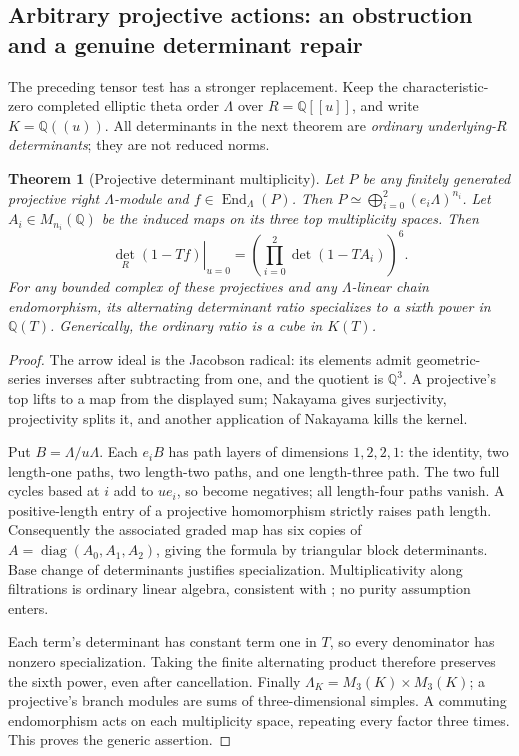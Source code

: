 \documentclass[11pt]{article}
\newtheorem{theorem}{Theorem}[section]
\theoremstyle{definition}\newtheorem{definition}[theorem]{Definition}
\theoremstyle{remark}\newtheorem{remark}[theorem]{Remark}
\begin{document}
\subsection{Arbitrary projective actions: an obstruction and a genuine determinant repair}
The preceding tensor test has a stronger replacement. Keep the characteristic-zero completed elliptic theta order $\Lambda$ over $R=\mathbb Q[[u]]$, and write $K=\mathbb Q((u))$. All determinants in the next theorem are \emph{ordinary underlying-$R$ determinants}; they are not reduced norms.
\begin{theorem}[Projective determinant multiplicity]\label{thm:theta-multiplicity}
Let $P$ be any finitely generated projective right $\Lambda$-module and $f\in\operatorname{End}_\Lambda(P)$. Then $P\simeq\bigoplus_{i=0}^2(e_i\Lambda)^{n_i}$. Let $A_i\in M_{n_i}(\mathbb Q)$ be the induced maps on its three top multiplicity spaces. Then
\[
 \left.\det_R(1-Tf)\right|_{u=0}
 =\left(\prod_{i=0}^2\det(1-TA_i)\right)^6.
\]
For any bounded complex of these projectives and any $\Lambda$-linear chain endomorphism, its alternating determinant ratio specializes to a sixth power in $\mathbb Q(T)$. Generically, the ordinary ratio is a cube in $K(T)$.
\end{theorem}
\begin{proof}
The arrow ideal is the Jacobson radical: its elements admit geometric-series inverses after subtracting from one, and the quotient is $\mathbb Q^3$. A projective's top lifts to a map from the displayed sum; Nakayama gives surjectivity, projectivity splits it, and another application of Nakayama kills the kernel.

Put $B=\Lambda/u\Lambda$. Each $e_iB$ has path layers of dimensions $1,2,2,1$: the identity, two length-one paths, two length-two paths, and one length-three path. The two full cycles based at $i$ add to $ue_i$, so become negatives; all length-four paths vanish. A positive-length entry of a projective homomorphism strictly raises path length. Consequently the associated graded map has six copies of $A=\operatorname{diag}(A_0,A_1,A_2)$, giving the formula by triangular block determinants. Base change of determinants justifies specialization. Multiplicativity along filtrations is ordinary linear algebra, consistent with \cite[Tags0FJ9,0GSX]{StacksDeterminants}; no purity assumption enters.

Each term's determinant has constant term one in $T$, so every denominator has nonzero specialization. Taking the finite alternating product therefore preserves the sixth power, even after cancellation. Finally $\Lambda_K=M_3(K)\times M_3(K)$; a projective's branch modules are sums of three-dimensional simples. A commuting endomorphism acts on each multiplicity space, repeating every factor three times. This proves the generic assertion.
\end{proof}
\end{document}
